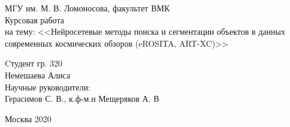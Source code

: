 \begin{center} 

\large МГУ им. М. В. Ломоносова, факультет ВМК\\[5.5cm] 

\huge Курсовая работа \\[0.6cm] %
\large на тему:  <<Нейросетевые методы поиска и сегментации объектов в данных современных 
космических обзоров (eROSITA, ART-XC)>>\\[3.7cm]


\end{center} 

\begin{flushright}
Cтудент гр. 320 \\
Немешаева Алиса \\
Научные руководители: \\
Герасимов С. В., к.ф-м.н Мещеряков А. В \\
\end{flushright}


\vfill 

\begin{center} 
\large Москва 2020
\end{center} 

\thispagestyle{empty}
